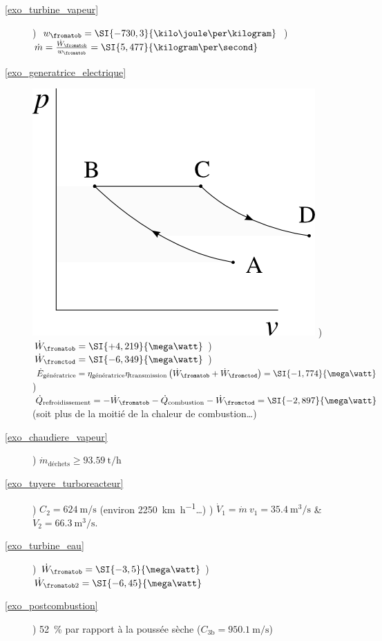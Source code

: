 \begin{description}
	\item [\ref{exo_turbine_vapeur}] 
					) $w_\fromatob = \SI{-730,3}{\kilo\joule\per\kilogram}$
					) $\dot m = \frac{\dot{W}_\fromatob}{w_\fromatob} = \SI{5,477}{\kilogram\per\second}$
	\item [\ref{exo_generatrice_electrique}]
					\includegraphics[width=\solutiondiagramwidth]{images/exo_pv_1.png}
					) $\dot{W}_\fromatob = \SI{+4,219}{\mega\watt}$
					) $\dot{W}_\fromctod = \SI{-6,349}{\mega\watt}$
					) $\dot{E}_\text{génératrice} = \eta_\text{génératrice} \eta_\text{transmission} \left(\dot{W}_\fromatob + \dot{W}_\fromctod\right) = \SI{-1,774}{\mega\watt}$
					) $\dot{Q}_\text{refroidissement} = - \dot{W}_\fromatob - \dot{Q}_\text{combustion} - \dot{W}_\fromctod = \SI{-2,897}{\mega\watt}$ (soit plus de la moitié de la chaleur de combustion…)
	\item [\ref{exo_chaudiere_vapeur}] 
					) $\dot{m}_\text{déchets} \geq \SI{93,59}{\tonne\per\hour}$
	\item [\ref{exo_tuyere_turboreacteur}] 
					) $C_2 = \SI{624}{\metre\per\second}$ (environ \SI[per-mode=symbol]{2250}{\kilo\metre\per\hour}…)
					) $\dot{V}_1 = \dot m \ v_1 = \SI{35,4}{\metre\cubed\per\second}$ \& $\dot{V}_2 = \SI{66,3}{\metre\cubed\per\second}$.
	\item [\ref{exo_turbine_eau}]
					) $\dot{W}_\fromatob = \SI{-3,5}{\mega\watt}$
					) $\dot{W}_{\fromatob2} = \SI{-6,45}{\mega\watt}$
	\item [\ref{exo_postcombustion}] 
					) \SI{+52}{\percent} par rapport à la poussée sèche ($C_{3\text{b}} = \SI{950,1}{\metre\per\second}$)

\end{description}
